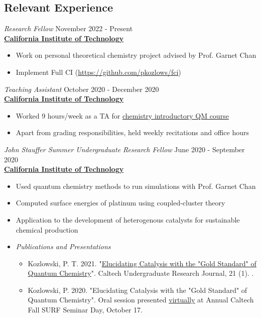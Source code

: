 \documentclass[margin,line]{resume}
\begin{document}
\begin{resume}
\section{\mysidestyle Relevant Experience}
{\sl Research Fellow} \hfill November 2022 - Present\\
\textbf{\href{https://www.caltech.edu/}{California Institute of Technology}}
\begin{itemize}
\item Work on personal theoretical chemistry project advised by Prof. Garnet Chan
\item Implement Full CI (\url{https://github.com/pkozlows/fci})
\end{itemize}
{\sl Teaching Assistant} \hfill October 2020 - December 2020\\
\textbf{\href{https://www.caltech.edu/}{California Institute of Technology}}
\begin{itemize}
\item Worked 9 hours/week as a TA for \href{https://www.cce.caltech.edu/academics/courses/ch-21-abc}{chemistry introductory QM course}
\item Apart from grading responsibilities, held weekly recitations and office hours
\end{itemize}
{\sl John Stauffer Summer Undergraduate Research Fellow} \hfill June 2020 - September 2020 \\
\textbf{\href{https://www.caltech.edu/}{California Institute of Technology}}
\begin{itemize}
\item Used quantum chemistry methods to run simulations with Prof. Garnet Chan
\item Computed surface energies of platinum using coupled-cluster theory
\item Application to the development of heterogenous catalysts for sustainable chemical production
\item \emph{Publications and Presentations}
    \begin{itemize}
        \item Kozlowski, P. T. 2021. "\href{https://curj.caltech.edu/2021/06/29/elucidating-catalysis-with-the-gold-standard-of-quantum-chemistry/}{Elucidating Catalysis with the "Gold Standard" of Quantum Chemistry}". Caltech Undergraduate Research Journal, 21 (1). \url{}.
        \item Kozlowski, P. 2020. "Elucidating Catalysis with the "Gold Standard" of Quantum Chemistry". Oral session presented \href{https://youtu.be/pcNnGM0bYRw}{virtually} at Annual Caltech Fall SURF Seminar Day, October 17.

\end{itemize}
\end{itemize}
\end{resume}
\end{document}
